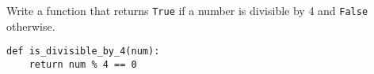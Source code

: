 \begin{blocksection}
\question Write a function that returns \lstinline{True} if a number is divisible by 4 and \lstinline{False} otherwise.







\begin{solution}[1in]
\begin{lstlisting}
def is_divisible_by_4(num):
    return num % 4 == 0
\end{lstlisting}
\end{solution}
\end{blocksection}
